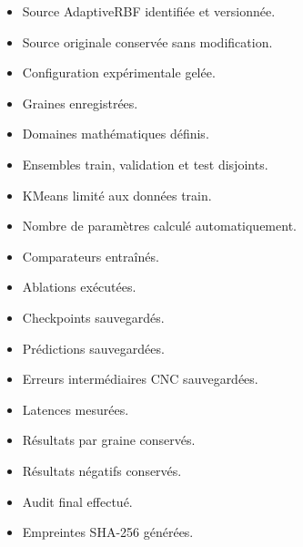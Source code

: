 \documentclass[11pt,a4paper]{article}
\begin{document}
\begin{itemize}
    \item[$\square$] Source AdaptiveRBF identifiée et versionnée.
    \item[$\square$] Source originale conservée sans modification.
    \item[$\square$] Configuration expérimentale gelée.
    \item[$\square$] Graines enregistrées.
    \item[$\square$] Domaines mathématiques définis.
    \item[$\square$] Ensembles train, validation et test disjoints.
    \item[$\square$] KMeans limité aux données train.
    \item[$\square$] Nombre de paramètres calculé automatiquement.
    \item[$\square$] Comparateurs entraînés.
    \item[$\square$] Ablations exécutées.
    \item[$\square$] Checkpoints sauvegardés.
    \item[$\square$] Prédictions sauvegardées.
    \item[$\square$] Erreurs intermédiaires CNC sauvegardées.
    \item[$\square$] Latences mesurées.
    \item[$\square$] Résultats par graine conservés.
    \item[$\square$] Résultats négatifs conservés.
    \item[$\square$] Audit final effectué.
    \item[$\square$] Empreintes SHA-256 générées.
\end{itemize}
\end{document}
